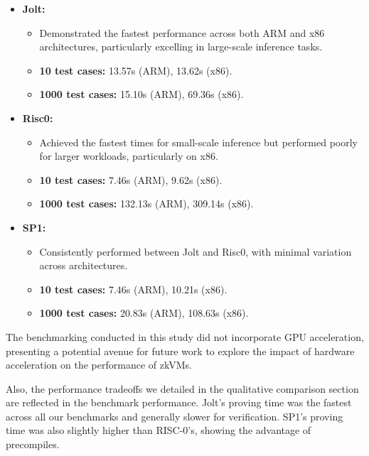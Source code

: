 \documentclass{scrartcl}
\begin{document}
\begin{itemize}
	\item \textbf{Jolt:}
	      \begin{itemize}
		      \item Demonstrated the fastest performance across both ARM and x86 architectures, particularly excelling in large-scale inference tasks.
		      \item \textbf{10 test cases:} 13.57s (ARM), 13.62s (x86).
		      \item \textbf{1000 test cases:} 15.10s (ARM), 69.36s (x86).
	      \end{itemize}
	\item \textbf{Risc0:}
	      \begin{itemize}
		      \item Achieved the fastest times for small-scale inference but performed poorly for larger workloads, particularly on x86.
		      \item \textbf{10 test cases:} 7.46s (ARM), 9.62s (x86).
		      \item \textbf{1000 test cases:} 132.13s (ARM), 309.14s (x86).
	      \end{itemize}
	\item \textbf{SP1:}
	      \begin{itemize}
		      \item Consistently performed between Jolt and Risc0, with minimal variation across architectures.
		      \item \textbf{10 test cases:} 7.46s (ARM), 10.21s (x86).
		      \item \textbf{1000 test cases:} 20.83s (ARM), 108.63s (x86).
	      \end{itemize}
\end{itemize}

The benchmarking conducted in this study did not incorporate GPU acceleration, presenting a potential avenue for future work to explore the impact of hardware acceleration on the performance of zkVMs.

Also, the performance tradeoffs we detailed in the qualitative comparison section are reflected in the benchmark performance. Jolt's proving time was the fastest across all our benchmarks and generally slower for verification. SP1's proving time was also slightly higher than RISC-0's, showing the advantage of precompiles.

\newpage
\singlespacing


\end{document}
